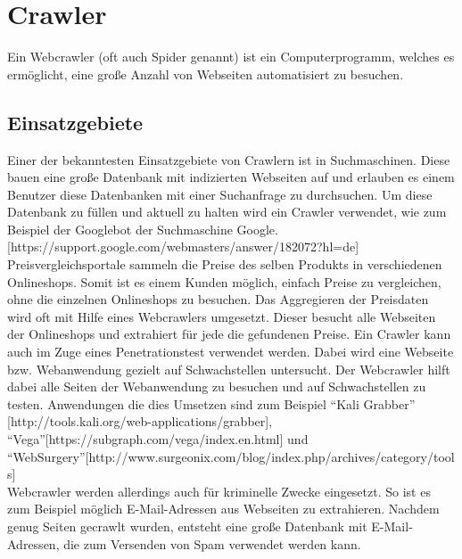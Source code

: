 \section{Crawler}
Ein Webcrawler (oft auch Spider genannt) ist ein Computerprogramm, welches es ermöglicht, eine große Anzahl von Webseiten automatisiert zu besuchen.
\subsection{Einsatzgebiete}
Einer der bekanntesten Einsatzgebiete von Crawlern ist in Suchmaschinen. Diese bauen eine große Datenbank mit indizierten Webseiten auf und erlauben es einem Benutzer diese Datenbanken mit einer Suchanfrage zu durchsuchen. Um diese Datenbank zu füllen und aktuell zu halten wird ein Crawler verwendet, wie zum Beispiel der Googlebot der Suchmaschine Google.  [https://support.google.com/webmasters/answer/182072?hl=de] \\
Preisvergleichsportale sammeln die Preise des selben Produkts in verschiedenen Onlineshops. Somit ist es einem Kunden möglich, einfach Preise zu vergleichen, ohne die einzelnen Onlineshops zu besuchen. Das Aggregieren der Preisdaten wird oft mit Hilfe eines Webcrawlers umgesetzt. Dieser besucht alle Webseiten der Onlineshops und extrahiert für jede die gefundenen Preise. 
Ein Crawler kann auch im Zuge eines Penetrationstest verwendet werden. Dabei wird eine Webseite bzw. Webanwendung gezielt auf Schwachstellen untersucht. Der Webcrawler hilft dabei alle Seiten der Webanwendung zu besuchen und auf Schwachstellen zu testen. Anwendungen die dies Umsetzen sind zum Beispiel \enquote{Kali Grabber} [http://tools.kali.org/web-applications/grabber], \enquote{Vega}[https://subgraph.com/vega/index.en.html] und \enquote{WebSurgery}[http://www.surgeonix.com/blog/index.php/archives/category/tools] \\
Webcrawler werden allerdings auch für kriminelle Zwecke eingesetzt. So ist es zum Beispiel möglich E-Mail-Adressen aus Webseiten zu extrahieren. Nachdem genug Seiten gecrawlt wurden, entsteht eine große Datenbank mit E-Mail-Adressen, die zum Versenden von Spam verwendet werden kann. \\
